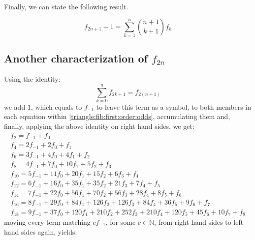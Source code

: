 Finally, we can state the following result.
\begin{thm}
    \begin{displaymath}
        f_{2n+1} - 1 = \sum_{k=1}^{n}{{{n+1}\choose{k+1}}f_{k}}
    \end{displaymath}
\end{thm}

\subsection{Another characterization of $f_{2n}$}
Using the identity:
\begin{displaymath}
    \sum_{k=0}^{n} f_{2 k + 1} = f_{2 (n+1)}
\end{displaymath}
we add $1$, which equals to $f_{-1}$ to leave this term
as a symbol, to both members in each equation within 
\autoref{triangle:fib:first:order:odds}, accumulating them
and, finally, applying the above identity on right hand sides, we get:
\begin{equation}
    \begin{array}{c}
        f_{2} = f_{-1} + f_{0}\\
        f_{4} =2 f_{-1} + 2 f_{0} + f_{1}\\
        f_{6} =3 f_{-1} + 4 f_{0} + 4 f_{1} + f_{2}\\
        f_{8} =4 f_{-1} + 7 f_{0} + 10 f_{1} + 5 f_{2} + f_{3}\\
        f_{10} =5 f_{-1} + 11 f_{0} + 20 f_{1} + 15 f_{2} + 6 f_{3} + f_{4}\\
        f_{12} =6 f_{-1} + 16 f_{0} + 35 f_{1} + 35 f_{2} + 21 f_{3} + 7 f_{4} + f_{5}\\
        f_{14} =7 f_{-1} + 22 f_{0} + 56 f_{1} + 70 f_{2} + 56 f_{3} + 28 f_{4} + 8 f_{5} + f_{6}\\
        f_{16} =8 f_{-1} + 29 f_{0} + 84 f_{1} + 126 f_{2} + 126 f_{3} + 84 f_{4} + 36 f_{5} + 9 f_{6} + f_{7}\\
        f_{18} =9 f_{-1} + 37 f_{0} + 120 f_{1} + 210 f_{2} + 252 f_{3} + 210 f_{4} + 120 f_{5} + 45 f_{6} + 10 f_{7} + f_{8}
    \end{array}
    \label{eq:tringle:even:subscripted:fibs:sym}
\end{equation}
moving every term matching $c f_{-1}$, for some $c\in\mathbb{N}$, from right hand sides to
left hand sides again, yields:
